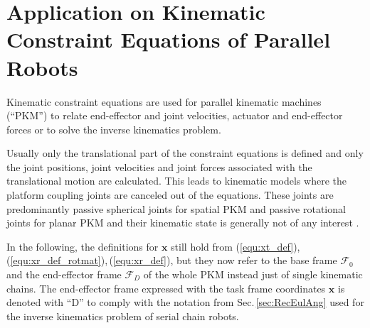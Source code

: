 \documentclass[twocolumn,10pt]{IFTOMM}
\newcommand{\bm}[1]{\boldsymbol{#1}}
\newcommand{\ks}[1]{{\mathcal{F}}_{#1}}
\begin{document}
\section{Application on Kinematic Constraint Equations of Parallel Robots}
\label{sec:ParRobKinConstr}

Kinematic constraint equations are used for parallel kinematic machines (``PKM'') to relate end-effector and joint velocities, actuator and end-effector forces or to solve the inverse kinematics problem.

Usually only the translational part of the constraint equations is defined and only the joint positions, joint velocities and joint forces associated with the translational motion are calculated.
This leads to kinematic models where the platform coupling joints are canceled out of the equations. These joints are predominantly passive spherical joints for spatial PKM and passive rotational joints for planar PKM and their kinematic state is generally not of any interest \cite{Merlet2006}.

In the following, the definitions for $\bm{x}$ still hold from  (\ref{equ:xt_def}),\,(\ref{equ:xr_def_rotmat}),\,(\ref{equ:xr_def}), but they now refer to the base frame $\ks{0}$ and the end-effector frame $\ks{D}$ of the whole PKM instead just of single kinematic chains.
The end-effector frame expressed with the task frame coordinates $\bm{x}$ is denoted with ``D'' to comply with the notation from Sec.\,\ref{sec:RecEulAng} used for the inverse kinematics problem of serial chain robots.
\end{document}
